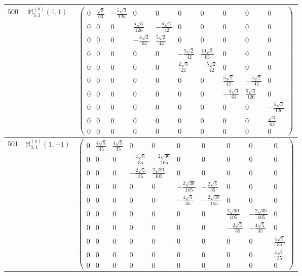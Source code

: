 \documentclass[fleqn,8pt,landscape]{jsarticle}
\begin{document}
\begin{center}
\begin{longtable}{ccc}
$ 500 $ & $ \mathbb{M}_{3,1}^{(a)}(1,1) $ & $ \begin{pmatrix} 0 & \frac{\sqrt{3}}{63} & - \frac{5 \sqrt{3}}{126} & 0 & 0 & 0 & 0 & 0 & 0 & 0 \\ 0 & 0 & 0 & \frac{5 \sqrt{3}}{126} & - \frac{5 \sqrt{2}}{42} & 0 & 0 & 0 & 0 & 0 \\ 0 & 0 & 0 & - \frac{4 \sqrt{3}}{63} & \frac{5 \sqrt{2}}{42} & 0 & 0 & 0 & 0 & 0 \\ 0 & 0 & 0 & 0 & 0 & - \frac{5 \sqrt{2}}{42} & \frac{10 \sqrt{3}}{63} & 0 & 0 & 0 \\ 0 & 0 & 0 & 0 & 0 & \frac{2 \sqrt{3}}{21} & - \frac{5 \sqrt{2}}{42} & 0 & 0 & 0 \\ 0 & 0 & 0 & 0 & 0 & 0 & 0 & \frac{5 \sqrt{2}}{42} & - \frac{5 \sqrt{2}}{42} & 0 \\ 0 & 0 & 0 & 0 & 0 & 0 & 0 & - \frac{4 \sqrt{3}}{63} & \frac{5 \sqrt{3}}{126} & 0 \\ 0 & 0 & 0 & 0 & 0 & 0 & 0 & 0 & 0 & - \frac{5 \sqrt{3}}{126} \\ 0 & 0 & 0 & 0 & 0 & 0 & 0 & 0 & 0 & \frac{\sqrt{3}}{63} \\ 0 & 0 & 0 & 0 & 0 & 0 & 0 & 0 & 0 & 0 \end{pmatrix} $ \\ \hline
$ 501 $ & $ \mathbb{M}_{3,1}^{(a)}(1,-1) $ & $ \begin{pmatrix} 0 & \frac{4 \sqrt{5}}{35} & \frac{4 \sqrt{5}}{35} & 0 & 0 & 0 & 0 & 0 & 0 & 0 \\ 0 & 0 & 0 & - \frac{4 \sqrt{5}}{35} & - \frac{2 \sqrt{30}}{105} & 0 & 0 & 0 & 0 & 0 \\ 0 & 0 & 0 & - \frac{2 \sqrt{5}}{35} & \frac{2 \sqrt{30}}{105} & 0 & 0 & 0 & 0 & 0 \\ 0 & 0 & 0 & 0 & 0 & - \frac{2 \sqrt{30}}{105} & - \frac{2 \sqrt{5}}{35} & 0 & 0 & 0 \\ 0 & 0 & 0 & 0 & 0 & - \frac{4 \sqrt{5}}{35} & - \frac{2 \sqrt{30}}{105} & 0 & 0 & 0 \\ 0 & 0 & 0 & 0 & 0 & 0 & 0 & \frac{2 \sqrt{30}}{105} & - \frac{2 \sqrt{30}}{105} & 0 \\ 0 & 0 & 0 & 0 & 0 & 0 & 0 & - \frac{2 \sqrt{5}}{35} & - \frac{4 \sqrt{5}}{35} & 0 \\ 0 & 0 & 0 & 0 & 0 & 0 & 0 & 0 & 0 & \frac{4 \sqrt{5}}{35} \\ 0 & 0 & 0 & 0 & 0 & 0 & 0 & 0 & 0 & \frac{4 \sqrt{5}}{35} \\ 0 & 0 & 0 & 0 & 0 & 0 & 0 & 0 & 0 & 0 \end{pmatrix} $ \\ \hline

\end{longtable}
\end{center}
\end{document}
